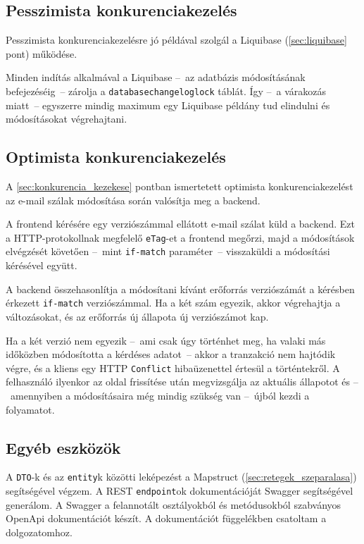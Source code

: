 \subsection{Pesszimista konkurenciakezelés}
Pesszimista konkurenciakezelésre jó példával szolgál a Liquibase (\ref{sec:liquibase} pont) működése. 

Minden indítás alkalmával a Liquibase --~az adatbázis módosításának befejezéséig~--   zárolja a \texttt{databasechangeloglock} táblát. Így --~a várakozás miatt~-- egyszerre mindig maximum egy Liquibase példány tud elindulni és módosításokat végrehajtani.


\subsection{Optimista konkurenciakezelés}
A \ref{sec:konkurencia_kezekese} pontban ismertetett optimista konkurenciakezelést az e-mail szálak módosítása során valósítja meg a backend.

A frontend kérésére egy verziószámmal ellátott e-mail szálat küld a backend. Ezt a HTTP-protokollnak megfelelő \texttt{eTag}-et a frontend megőrzi, majd a módosítások elvégzését követően --~mint \texttt{if-match} paraméter~-- visszaküldi a módosítási kérésével együtt.

A backend összehasonlítja a módosítani kívánt erőforrás verziószámát a kérésben érkezett \texttt{if-match} verziószámmal. Ha a két szám egyezik, akkor végrehajtja a változásokat, és az erőforrás új állapota új verziószámot kap.

Ha a két verzió nem egyezik --~ami csak úgy történhet meg, ha valaki más időközben módosította a kérdéses adatot~-- akkor a tranzakció nem hajtódik végre, és a kliens egy HTTP \texttt{Conflict} hibaüzenettel értesül a történtekről. A felhasználó ilyenkor az oldal frissítése után megvizsgálja az aktuális állapotot és --~amennyiben a módosításaira még mindig szükség van --~újból kezdi a folyamatot.

\subsection{Egyéb eszközök}\label{sec:backend_egyeb_eszkozok}
A \texttt{DTO}-k és az \texttt{entity}k közötti leképezést a Mapstruct (\ref{sec:retegek_szeparalasa}) segítségével végzem. A REST \texttt{endpoint}ok dokumentációját Swagger segítségével generálom. A Swagger a felannotált osztályokból és metódusokból szabványos OpenApi dokumentációt készít. A dokumentációt  függelékben csatoltam a dolgozatomhoz.



